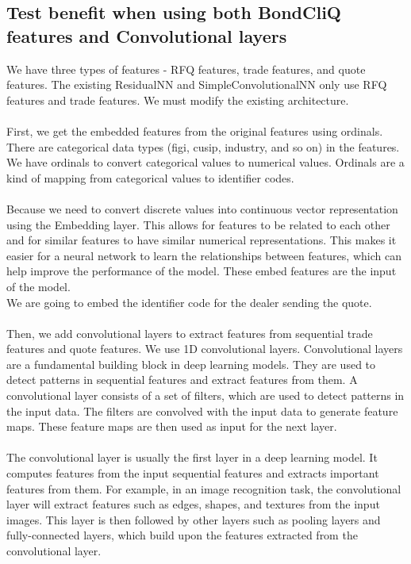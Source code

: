 \documentclass{article}
\begin{document}
\subsection{Test benefit when using both BondCliQ features and Convolutional layers}

We have three types of features - RFQ features, trade features, and quote features. The existing ResidualNN and SimpleConvolutionalNN only use RFQ features and trade features. We must modify the existing architecture.\\
\\
First, we get the embedded features from the original features using ordinals. There are categorical data types (figi, cusip, industry, and so on) in the features. We have ordinals to convert categorical values to numerical values. Ordinals are a kind of mapping from categorical values to identifier codes.\\
\\
Because we need to convert discrete values into continuous vector representation using the Embedding layer. This allows for features to be related to each other and for similar features to have similar numerical representations. This makes it easier for a neural network to learn the relationships between features, which can help improve the performance of the model. These embed features are the input of the model.\\
We are going to embed the identifier code for the dealer sending the quote.\\
\\
Then, we add convolutional layers to extract features from sequential trade features and quote features. We use 1D convolutional layers. Convolutional layers are a fundamental building block in deep learning models. They are used to detect patterns in sequential features and extract features from them. A convolutional layer consists of a set of filters, which are used to detect patterns in the input data. The filters are convolved with the input data to generate feature maps. These feature maps are then used as input for the next layer.\\
\\
The convolutional layer is usually the first layer in a deep learning model. It computes features from the input sequential features and extracts important features from them. For example, in an image recognition task, the convolutional layer will extract features such as edges, shapes, and textures from the input images. This layer is then followed by other layers such as pooling layers and fully-connected layers, which build upon the features extracted from the convolutional layer.\\
\end{document}

